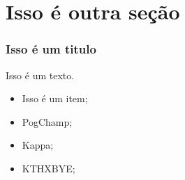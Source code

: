 \documentclass{beamer}
\begin{document}
\section{Isso é outra seção}
\begin{frame}
    \frametitle{Isso é um titulo}

    Isso é um texto.
    \begin{itemize}
        \item Isso é um item;
        \item PogChamp;
        \item Kappa;
        \item KTHXBYE;
    \end{itemize}
\end{frame}
\end{document}
